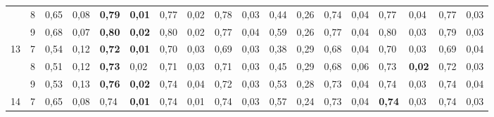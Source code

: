 \documentclass[conference]{IEEEtran}
\begin{document}
\begin{table}[]
\begin{tabular}{|cl|ll|ll|ll|ll|ll|ll|ll|ll|}
		\multicolumn{1}{|c|}{}                    & 8 & \multicolumn{1}{l|}{0,65} & 0,08          & \multicolumn{1}{l|}{\textbf{0,79}} & \textbf{0,01} & \multicolumn{1}{l|}{0,77}          & 0,02 & \multicolumn{1}{l|}{0,78}          & 0,03 & \multicolumn{1}{l|}{0,44}                 & 0,26 & \multicolumn{1}{l|}{0,74} & 0,04 & \multicolumn{1}{l|}{0,77}          & 0,04          & \multicolumn{1}{l|}{0,77}          & 0,03          \\ \cline{2-18} 
		\multicolumn{1}{|c|}{}                    & 9 & \multicolumn{1}{l|}{0,68} & 0,07          & \multicolumn{1}{l|}{\textbf{0,80}} & \textbf{0,02} & \multicolumn{1}{l|}{0,80}          & 0,02 & \multicolumn{1}{l|}{0,77}          & 0,04 & \multicolumn{1}{l|}{0,59}                 & 0,26 & \multicolumn{1}{l|}{0,77} & 0,04 & \multicolumn{1}{l|}{0,80}          & 0,03          & \multicolumn{1}{l|}{0,79}          & 0,03          \\ \hline
		\multicolumn{1}{|c|}{\multirow{3}{*}{13}} & 7 & \multicolumn{1}{l|}{0,54} & 0,12          & \multicolumn{1}{l|}{\textbf{0,72}} & \textbf{0,01} & \multicolumn{1}{l|}{0,70}          & 0,03 & \multicolumn{1}{l|}{0,69}          & 0,03 & \multicolumn{1}{l|}{0,38}                 & 0,29 & \multicolumn{1}{l|}{0,68} & 0,04 & \multicolumn{1}{l|}{0,70}          & 0,03          & \multicolumn{1}{l|}{0,69}          & 0,04          \\ \cline{2-18} 
		\multicolumn{1}{|c|}{}                    & 8 & \multicolumn{1}{l|}{0,51} & 0,12          & \multicolumn{1}{l|}{\textbf{0,73}} & 0,02          & \multicolumn{1}{l|}{0,71}          & 0,03 & \multicolumn{1}{l|}{0,71}          & 0,03 & \multicolumn{1}{l|}{0,45}                 & 0,29 & \multicolumn{1}{l|}{0,68} & 0,06 & \multicolumn{1}{l|}{0,73}          & \textbf{0,02} & \multicolumn{1}{l|}{0,72}          & 0,03          \\ \cline{2-18} 
		\multicolumn{1}{|c|}{}                    & 9 & \multicolumn{1}{l|}{0,53} & 0,13          & \multicolumn{1}{l|}{\textbf{0,76}} & \textbf{0,02} & \multicolumn{1}{l|}{0,74}          & 0,04 & \multicolumn{1}{l|}{0,72}          & 0,03 & \multicolumn{1}{l|}{0,53}                 & 0,28 & \multicolumn{1}{l|}{0,73} & 0,04 & \multicolumn{1}{l|}{0,74}          & 0,03          & \multicolumn{1}{l|}{0,74}          & 0,04          \\ \hline
		\multicolumn{1}{|c|}{\multirow{3}{*}{14}} & 7 & \multicolumn{1}{l|}{0,65} & 0,08          & \multicolumn{1}{l|}{0,74}          & \textbf{0,01} & \multicolumn{1}{l|}{0,74}          & 0,01 & \multicolumn{1}{l|}{0,74}          & 0,03 & \multicolumn{1}{l|}{0,57}                 & 0,24 & \multicolumn{1}{l|}{0,73} & 0,04 & \multicolumn{1}{l|}{\textbf{0,74}} & 0,03          & \multicolumn{1}{l|}{0,74}          & 0,03          \\ \cline{2-18} 

\end{tabular}
\end{table}
\end{document}
